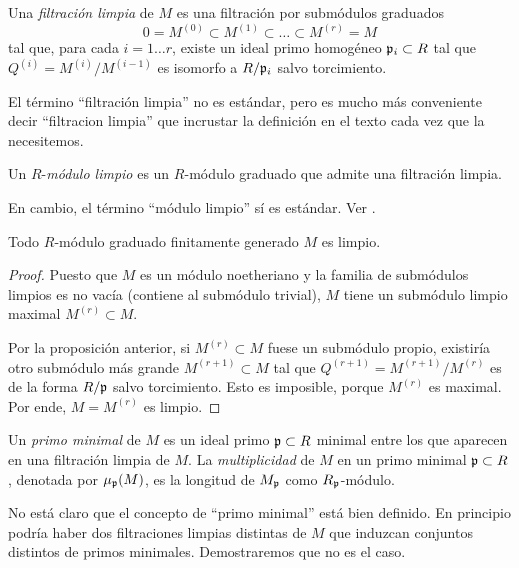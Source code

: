 \begin{definition}
Una \textit{filtración limpia} de $M$ es una filtración por submódulos graduados
$$0 = M^{(0)} \subset M^{(1)} \subset \dots \subset M^{(r)} = M$$
tal que, para cada $i = 1 \dots r$, existe un ideal primo homogéneo $\mathfrak p_i \subset R$ tal que $Q^{(i)} = M^{(i)} / M^{(i-1)}$ es isomorfo a $R/\mathfrak p_i$ salvo torcimiento.
\end{definition}

\begin{remark}
El término ``filtración limpia'' no es estándar, pero es mucho más conveniente decir ``filtracion limpia'' que incrustar la definición en el texto cada vez que la necesitemos.
\end{remark}

\begin{definition}
Un $R$-\textit{módulo limpio} es un $R$-módulo graduado que admite una filtración limpia.
\end{definition}

\begin{remark}
En cambio, el término ``módulo limpio'' sí es estándar. Ver \cite[p. 93]{eisenbud}.
\end{remark}

\begin{proposition}
Todo $R$-módulo graduado finitamente generado $M$ es limpio.
\end{proposition}

\begin{proof}
Puesto que $M$ es un módulo noetheriano y la familia de submódulos limpios es no vacía (contiene al submódulo trivial), $M$ tiene un submódulo limpio maximal $M^{(r)} \subset M$.

Por la proposición anterior, si $M^{(r)} \subset M$ fuese un submódulo propio, existiría otro submódulo más grande $M^{(r+1)} \subset M$ tal que $Q^{(r+1)} = M^{(r+1)} / M^{(r)}$ es de la forma $R/\mathfrak p$ salvo torcimiento. Esto es imposible, porque $M^{(r)}$ es maximal. Por ende, $M = M^{(r)}$ es limpio.
\end{proof}

\begin{definition}
Un \textit{primo minimal} de $M$ es un ideal primo $\mathfrak p \subset R$ minimal entre los que aparecen en una filtración limpia de $M$. La \textit{multiplicidad} de $M$ en un primo minimal $\mathfrak p \subset R$, denotada por $\mu_\mathfrak p(M)$, es la longitud de $M_\mathfrak p$ como $R_\mathfrak p$-módulo.
\end{definition}

\begin{remark}
No está claro que el concepto de ``primo minimal'' está bien definido. En principio podría haber dos filtraciones limpias distintas de $M$ que induzcan conjuntos distintos de primos minimales. Demostraremos que no es el caso.
\end{remark}

